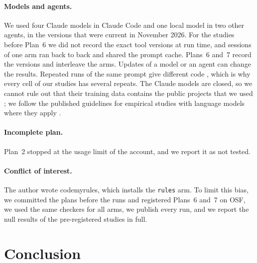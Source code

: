 \documentclass[pdflatex,sn-basic]{sn-jnl}
\newcommand{\arm}[1]{\texttt{#1}}
\begin{document}
\paragraph{Models and agents.}
We used four Claude models in Claude Code and one local model in two other agents, in the versions that were current in November 2026.
For the studies before Plan~6 we did not record the exact tool versions at run time, and sessions of one arm ran back to back and shared the prompt cache.
Plans~6 and~7 record the versions and interleave the arms.
Updates of a model or an agent can change the results.
Repeated runs of the same prompt give different code \citep{ouyang2025nondeterminism}, which is why every cell of our studies has several repeats.
The Claude models are closed, so we cannot rule out that their training data contains the public projects that we used \citep{sallou2024threats}; we follow the published guidelines for empirical studies with language models where they apply \citep{baltes2025guidelines}.

\paragraph{Incomplete plan.}
Plan~2 stopped at the usage limit of the account, and we report it as not tested.

\paragraph{Conflict of interest.}
The author wrote codemyrules, which installs the \arm{rules} arm.
To limit this bias, we committed the plans before the runs and registered Plans~6 and~7 on OSF, we used the same checkers for all arms, we publish every run, and we report the null results of the pre-registered studies in full.

\section{Conclusion}
\end{document}
